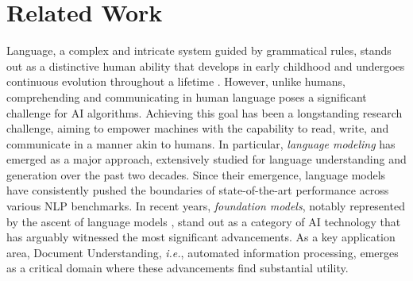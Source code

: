 \chapter{Related Work}
\label{chapter:related}


\renewcommand{\leftmark}{\spacedlowsmallcaps{Related work}}


\minitoc







Language, a complex and intricate system guided by grammatical rules, stands out as a distinctive human ability that develops in early childhood and undergoes continuous evolution throughout a lifetime \citep{hauser2002faculty}. However, unlike humans, comprehending and communicating in human language poses a significant challenge for \ac{AI} algorithms. Achieving this goal has been a longstanding research challenge, aiming to empower machines with the capability to read, write, and communicate in a manner akin to humans. In particular, \textit{language modeling} has emerged as a major approach, extensively studied for language understanding and generation over the past two decades. Since their emergence, language models have consistently pushed the boundaries of state-of-the-art performance across various \ac{NLP} benchmarks. In recent years, \textit{foundation models}, notably represented by the ascent of language models \citep{peters-etal-2018-deep, devlin2018bert, brown2020language}, stand out as a category of \ac{AI} technology that has arguably witnessed the most significant advancements. As a key application area, Document Understanding, \textit{i.e.}, automated information processing, emerges as a critical domain where these advancements find substantial utility.

